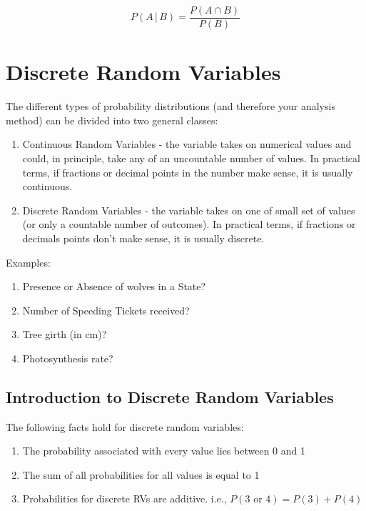 \documentclass[]{book}
\providecommand{\tightlist}{%
  \setlength{\itemsep}{0pt}\setlength{\parskip}{0pt}}
\begin{document}
\[P\left(A\,|\,B\right) =   \frac{P\left(A\cap B\right)}{P\left(B\right)}\]

\section{Discrete Random Variables}\label{discrete-random-variables}

The different types of probability distributions (and therefore your
analysis method) can be divided into two general classes:

\begin{enumerate}
\def\labelenumi{\arabic{enumi}.}
\item
  Continuous Random Variables - the variable takes on numerical values
  and could, in principle, take any of an uncountable number of values.
  In practical terms, if fractions or decimal points in the number make
  sense, it is usually continuous.
\item
  Discrete Random Variables - the variable takes on one of small set of
  values (or only a countable number of outcomes). In practical terms,
  if fractions or decimals points don't make sense, it is usually
  discrete.
\end{enumerate}

Examples:

\begin{enumerate}
\def\labelenumi{\arabic{enumi}.}
\tightlist
\item
  Presence or Absence of wolves in a State?
\item
  Number of Speeding Tickets received?
\item
  Tree girth (in cm)?
\item
  Photosynthesis rate?
\end{enumerate}

\subsection{Introduction to Discrete Random
Variables}\label{introduction-to-discrete-random-variables}

The following facts hold for discrete random variables:

\begin{enumerate}
\def\labelenumi{\arabic{enumi}.}
\tightlist
\item
  The probability associated with every value lies between 0 and 1
\item
  The sum of all probabilities for all values is equal to 1
\item
  Probabilities for discrete RVs are additive. i.e.,
  \(P(3\textrm{ or }4)=P(3)+P(4)\)
\end{enumerate}
\end{document}
